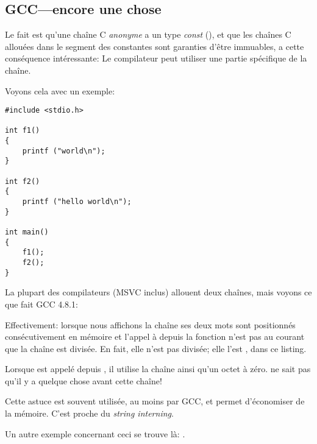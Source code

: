 ﻿\subsection{GCC---encore une chose}
\label{use_parts_of_C_strings}

Le fait est qu'une chaîne C \emph{anonyme} a un type \emph{const} (),
et que les chaînes C allouées dans le segment des constantes sont garanties d'être immuables,
a cette conséquence intéressante:
Le compilateur peut utiliser une partie spécifique de la chaîne.

Voyons cela avec un exemple:

\begin{lstlisting}[style=customc]
#include <stdio.h>

int f1()
{
	printf ("world\n");
}

int f2()
{
	printf ("hello world\n");
}

int main()
{
	f1();
	f2();
}
\end{lstlisting}

La plupart des compilateurs \CCpp{} (MSVC inclus) allouent deux chaînes, mais voyons ce que fait GCC 4.8.1:



Effectivement: lorsque nous affichons la chaîne  ses deux mots sont positionnés
consécutivement en mémoire et l'appel à \puts depuis la fonction 
n'est pas au courant que la chaîne est divisée.
En fait, elle n'est pas divisée; elle l'est , dans ce listing.

Lorsque \puts est appelé depuis , il utilise la chaîne  ainsi qu'un
octet à zéro. \puts ne sait pas qu'il y a quelque chose avant cette chaîne!

Cette astuce est souvent utilisée, au moins par GCC, et permet d'économiser de la mémoire.
C'est proche du \emph{string interning}. %

Un autre exemple concernant ceci se trouve là: .

